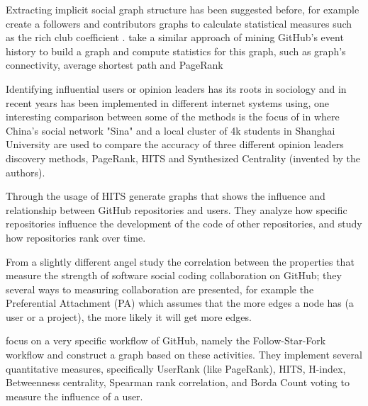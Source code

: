 \documentclass[sigconf,11pt]{acmart}
\begin{document}
Extracting implicit social graph structure has been suggested before,
for example \citeauthor{coding-together} \cite{coding-together} create a followers and contributors graphs
to calculate statistical measures such as the rich club coefficient \cite{wiki:rich-club-coefficient}.
\citeauthor{network-structure-social-coding}\cite{network-structure-social-coding} take a similar approach
of mining GitHub's event history to build a graph and compute statistics for this graph, such as
graph's connectivity, average shortest path and PageRank\cite{pagerank}

Identifying influential users or opinion leaders has its roots in sociology and in recent years has been
implemented in different internet systems using, one interesting comparison
between some of the methods is the focus of \citeauthor{identifying-top-n} in \cite{identifying-top-n}
where China's social network "Sina" and a local cluster of 4k students in Shanghai University are used
to compare the accuracy of three different opinion leaders discovery methods,
PageRank, HITS\cite{hits} and Synthesized Centrality (invented by the authors).

\citeauthor{influence-analysis-of-github-repositories}\cite{influence-analysis-of-github-repositories}
Through the usage of HITS generate graphs that shows the influence and relationship between GitHub
repositories and users.
They analyze how specific repositories influence the development of the code of other repositories,
and study how repositories rank over time.

From a slightly different angel \citeauthor{collaboration-strength-metrics-github}\cite{collaboration-strength-metrics-github}
study the correlation between the properties that measure the strength of software social coding
collaboration on GitHub; they several ways to measuring collaboration are presented, for example
the Preferential Attachment (PA) which assumes that the more edges a node has (a user or a project),
the more likely it will get more edges.

\citeauthor{user-influence-analysis-github}\cite{user-influence-analysis-github} focus on a very specific
workflow of GitHub, namely the Follow-Star-Fork workflow and construct a graph based on these activities.
They implement several quantitative measures, specifically UserRank (like PageRank), HITS, H-index\cite{wiki:h-index},
Betweenness centrality\cite{betweenness}, Spearman rank correlation\cite{wiki:spearman},
and Borda Count voting\cite{wiki:borda} to measure the influence of a user.
\end{document}
